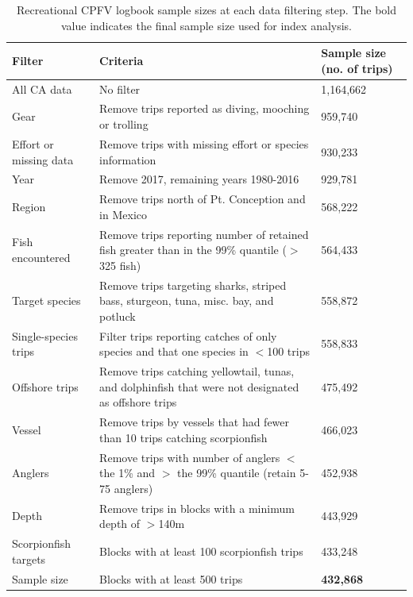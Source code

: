 \documentclass[12pt,]{article}
\begin{document}
\begin{table}[ht]
\centering
\caption{Recreational CPFV logbook sample 
                                          sizes at each data filtering step.  
                                          The bold value indicates the final sample size 
                                          used for index analysis.} 
\label{tab:Fleet5_RecPC_CPFVlogbook_filter}
\begin{tabular}{>{\raggedright}p{1.5in}>{\raggedright}p{3in}>{\raggedright}p{1in}}
  \hline
Filter & Criteria & Sample size (no. of trips) \\ 
  \hline
All CA data & No filter & 1,164,662 \\ 
  Gear & Remove trips reported as diving, mooching or trolling & 959,740 \\ 
  Effort or missing data & Remove trips with missing effort or species information & 930,233 \\ 
  Year & Remove 2017, remaining years 1980-2016 & 929,781 \\ 
  Region & Remove trips north of Pt. Conception and in Mexico & 568,222 \\ 
  Fish encountered & Remove trips reporting number of retained fish greater than in the 99\% quantile ($>$325 fish) & 564,433 \\ 
  Target species & Remove trips targeting sharks, striped bass, sturgeon, tuna, misc. bay, and potluck & 558,872 \\ 
  Single-species trips & Filter trips reporting catches of only species and that one species in $<$100 trips & 558,833 \\ 
  Offshore trips & Remove trips catching yellowtail, tunas, and dolphinfish that were not designated as offshore trips & 475,492 \\ 
  Vessel & Remove trips by vessels that had fewer than 10 trips catching scorpionfish & 466,023 \\ 
  Anglers & Remove trips with number of anglers $<$ the 1\% and $>$ the 99\% quantile (retain 5-75 anglers) & 452,938 \\ 
  Depth & Remove trips in blocks with a minimum depth of $>$140m & 443,929 \\ 
  Scorpionfish targets & Blocks with at least 100 scorpionfish trips & 433,248 \\ 
  Sample size & Blocks with at least 500 trips & \textbf{432,868} \\ 
   \hline
\end{tabular}
\end{table}\newpage
\end{document}

